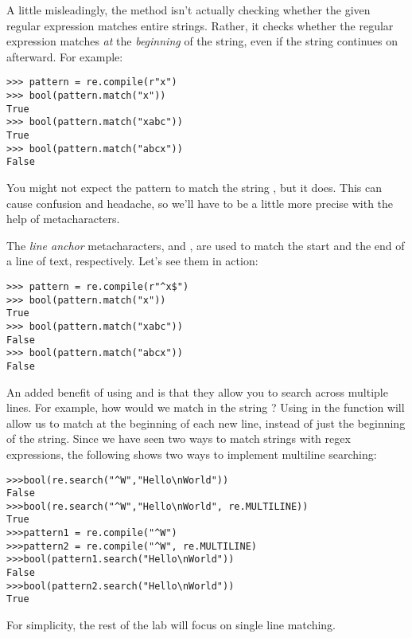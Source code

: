 A little misleadingly, the  method isn't actually checking whether the given regular expression matches entire strings.
Rather, it checks whether the regular expression matches \emph{at} the \emph{beginning} of the string, even if the string continues on afterward.
For example:
\begin{lstlisting}
>>> pattern = re.compile(r"x")
>>> bool(pattern.match("x"))
True
>>> bool(pattern.match("xabc"))
True
>>> bool(pattern.match("abcx"))
False
\end{lstlisting}

You might not expect the pattern  to match the string , but it does.
This can cause confusion and headache, so we'll have to be a little more precise with the help of metacharacters.

The \emph{line anchor} metacharacters,  and , are used to match the start and the end of a line of text, respectively.
Let's see them in action:
\begin{lstlisting}
>>> pattern = re.compile(r"^x$")
>>> bool(pattern.match("x"))
True
>>> bool(pattern.match("xabc"))
False
>>> bool(pattern.match("abcx"))
False
\end{lstlisting}

An added benefit of using  and  is that they allow you to search across multiple lines.
For example, how would we match  in the string \mbox{}?
Using  in the  function will allow us to match at the beginning of each new line, instead of just the beginning of the string.
Since we have seen two ways to match strings with regex expressions, the following shows two ways to implement multiline searching:

\begin{lstlisting}
>>>bool(re.search("^W","Hello\nWorld"))
False
>>>bool(re.search("^W","Hello\nWorld", re.MULTILINE))
True
>>>pattern1 = re.compile("^W")
>>>pattern2 = re.compile("^W", re.MULTILINE)
>>>bool(pattern1.search("Hello\nWorld"))
False
>>>bool(pattern2.search("Hello\nWorld"))
True
\end{lstlisting}

For simplicity, the rest of the lab will focus on single line matching.


